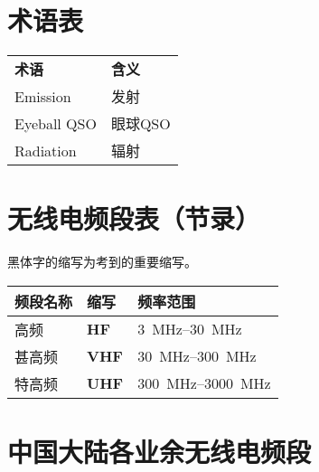 \newpage

\section{术语表}

\begin{longtable}[l]{ll}
  \textbf{术语} & \textbf{含义} \\
  Emission    & 发射          \\
  Eyeball QSO & 眼球QSO       \\
  Radiation   & 辐射          \\
\end{longtable}

\newpage

\section{无线电频段表（节录）}

黑体字的缩写为考到的重要缩写。

\begin{longtable}[c]{|l|l|l|}
  \hline
  \textbf{频段名称} & \textbf{缩写}  & \textbf{频率范围}                               \\
  \hline
  高频            & \textbf{HF}  & \qtyrange[range-phrase=--]{3}{30}{\MHz}     \\
  \hline
  甚高频           & \textbf{VHF} & \qtyrange[range-phrase=--]{30}{300}{\MHz}   \\
  \hline
  特高频           & \textbf{UHF} & \qtyrange[range-phrase=--]{300}{3000}{\MHz} \\
  \hline
\end{longtable}

\newpage

\section{中国大陆各业余无线电频段}


